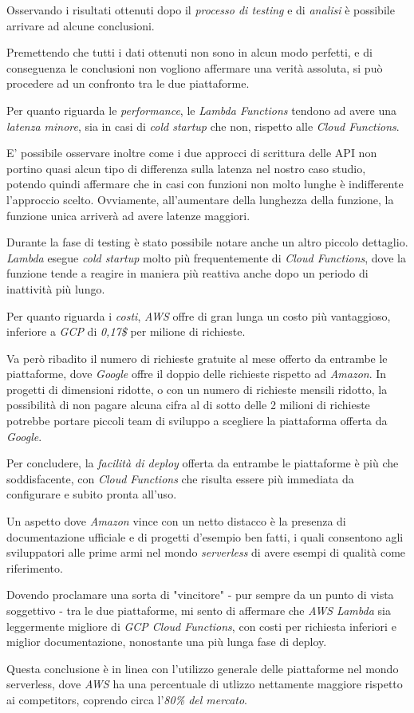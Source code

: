 Osservando i risultati ottenuti dopo il \textit{processo di testing} e di \textit{analisi} è possibile arrivare ad alcune conclusioni.

Premettendo che tutti i dati ottenuti non sono in alcun modo perfetti, e di conseguenza le conclusioni non vogliono affermare una verità assoluta, si può procedere ad un confronto tra le due piattaforme.

Per quanto riguarda le \textit{performance}, le \textit{Lambda Functions} tendono ad avere una \textit{latenza minore}, sia in casi di \textit{cold startup} che non, rispetto alle \textit{Cloud Functions}.

E' possibile osservare inoltre come i due approcci di scrittura delle API non portino quasi alcun tipo di differenza sulla latenza nel nostro caso studio, potendo quindi affermare che in casi con funzioni non molto lunghe è indifferente l'approccio scelto. Ovviamente, all'aumentare della lunghezza della funzione, la funzione unica arriverà ad avere latenze maggiori.

Durante la fase di testing è stato possibile notare anche un altro piccolo dettaglio. \textit{Lambda} esegue \textit{cold startup} molto più frequentemente di \textit{Cloud Functions}, dove la funzione tende a reagire in maniera più reattiva anche dopo un periodo di inattività più lungo.

Per quanto riguarda i \textit{costi}, \textit{AWS} offre di gran lunga un costo più vantaggioso, inferiore a \textit{GCP} di \textit{0,17\$} per milione di richieste.

Va però ribadito il numero di richieste gratuite al mese offerto da entrambe le piattaforme, dove \textit{Google} offre il doppio delle richieste rispetto ad \textit{Amazon}. In progetti di dimensioni ridotte, o con un numero di richieste mensili ridotto, la possibilità di non pagare alcuna cifra al di sotto delle 2 milioni di richieste potrebbe portare piccoli team di sviluppo a scegliere la piattaforma offerta da \textit{Google}.

Per concludere, la \textit{facilità di deploy} offerta da entrambe le piattaforme è più che soddisfacente, con \textit{Cloud Functions} che risulta essere più immediata da configurare e subito pronta all'uso.

Un aspetto dove \textit{Amazon} vince con un netto distacco è la presenza di documentazione ufficiale e di progetti d'esempio ben fatti, i quali consentono agli sviluppatori alle prime armi nel mondo \textit{serverless} di avere esempi di qualità come riferimento.

Dovendo proclamare una sorta di "vincitore" - pur sempre da un punto di vista soggettivo - tra le due piattaforme, mi sento di affermare che \textit{AWS Lambda} sia leggermente migliore di \textit{GCP Cloud Functions}, con costi per richiesta inferiori e miglior documentazione, nonostante una più lunga fase di deploy.

Questa conclusione è in linea con l'utilizzo generale delle piattaforme nel mondo serverless, dove \textit{AWS} ha una percentuale di utlizzo nettamente maggiore rispetto ai competitors, coprendo circa l'\textit{80\% del mercato}\cite{eismann2021state}.